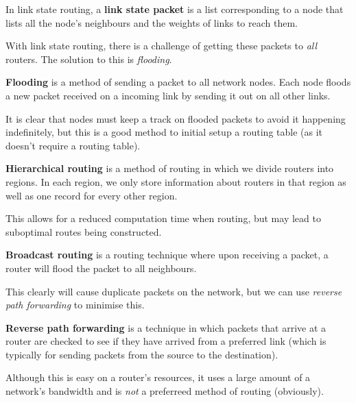 \begin{definition}
    In link state routing, a \textbf{link state packet} is a list corresponding to a node that lists all the node's neighbours and the weights of links to reach them.
\end{definition}

With link state routing, there is a challenge of getting these packets to \emph{all} routers. The solution to this is \emph{flooding}.

\begin{definition}[Flooding]
    \textbf{Flooding} is a method of sending a packet to all network nodes. Each node floods a new packet received on a incoming link by sending it out on all other links.
\end{definition}

It is clear that nodes must keep a track on flooded packets to avoid it happening indefinitely, but this is a good method to initial setup a routing table (as it doesn't require a routing table). 

\begin{definition}
    \textbf{Hierarchical routing} is a method of routing in which we divide routers into regions. In each region, we only store information about routers in that region as well as one record for every other region. 
\end{definition}

This allows for a reduced computation time when routing, but may lead to suboptimal routes being constructed.

\begin{definition}
    \textbf{Broadcast routing} is a routing technique where upon receiving a packet, a router will flood the packet to all neighbours.
\end{definition}

This clearly will cause duplicate packets on the network, but we can use \emph{reverse path forwarding} to minimise this.

\begin{definition}
    \textbf{Reverse path forwarding} is a technique in which packets that arrive at a router are checked to see if they have arrived from a preferred link (which is typically for sending packets from the source to the destination). 
\end{definition}

Although this is easy on a router's resources, it uses a large amount of a network's bandwidth and is \emph{not} a preferreed method of routing (obviously).
